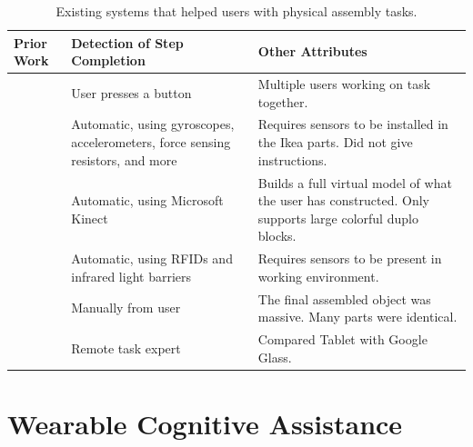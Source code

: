 \begin{table}
  \begin{tabular}{| l | p{2in} | p{2.5in} |}
    \hline
    Prior Work & Detection of Step Completion & Other Attributes\\
    \hline
    \citet{webuild} & User presses a button & Multiple users working on task
                                              together.\\
    \hline
    \citet{sensors} & Automatic, using gyroscopes, accelerometers, force sensing
                      resistors, and more & Requires sensors to be installed in
                                            the Ikea parts. Did not give
                                            instructions.\\
    \hline
    \citet{kinect} & Automatic, using Microsoft Kinect & Builds a full virtual
                                                         model of what the user
                                                         has constructed. Only
                                                         supports large colorful
                                                         duplo blocks. \\
    \hline
    \citet{smartwatch} & Automatic, using RFIDs and infrared light barriers
                                              & Requires sensors to be present
                                                in working environment.\\
    \hline
    \citet{robotic_arm} & Manually from user
                                              & The final assembled object was
                                                massive. Many parts were
                                                identical.\\
    \hline
    \citet{collaboration} & Remote task expert
                                              & Compared Tablet with Google
                                                Glass.\\
    \hline
\end{tabular}
\caption{
  Existing systems that helped users with physical assembly tasks.
}\label{table:prior_work}
\end{table}

\section{Wearable Cognitive Assistance}

